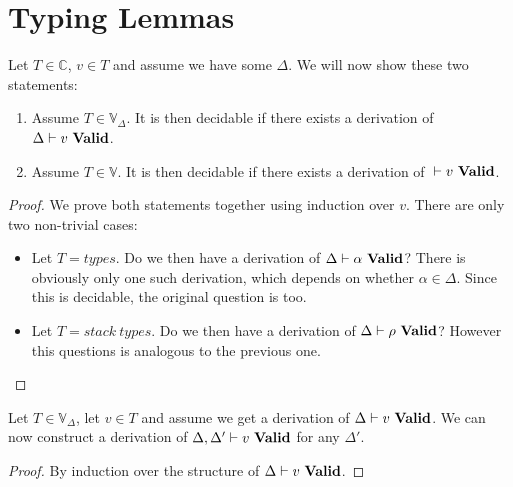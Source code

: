 \section{Typing Lemmas}

\begin{lemma}
  Let $T \in \mathbb{C}$, $v \in T$ and assume we have some $\Delta$. We will
  now show these two statements:
  \begin{enumerate}
  \item Assume $T \in \mathbb{V}_\Delta$. It is then decidable if there exists a
    derivation of ${\Delta} |- {v}\ \mathbf{Valid}$.
  \item Assume $T \in \mathbb{V}$. It is then decidable if there exists a
    derivation of ${} |- {v}\ \mathbf{Valid}$.
  \end{enumerate}
\end{lemma}
\label{dec:type}
\begin{proof}
  We prove both statements together using induction over $v$. There are only two
  non-trivial cases:

  \begin{itemize}
  \item Let $T = types$. Do we then have a derivation of
    ${\Delta} |- {\alpha}\ \mathbf{Valid}$?  There is obviously only one such derivation,
    which depends on whether $\alpha \in \Delta$. Since this is decidable, the
    original question is too.
  \item Let $T = stack\ types$. Do we then have a derivation of
    ${\Delta} |- {\rho}\ \mathbf{Valid}$? However this questions is analogous to the previous
    one.
  \end{itemize}
\end{proof}

\begin{lemma}
  Let $T \in \mathbb{V}_\Delta$, let $v \in T$ and assume we get a derivation of
  ${\Delta} |- {v}\ \mathbf{Valid}$. We can now construct a derivation of
  ${\Delta,\Delta'} |- {v}\ \mathbf{Valid}$ for any $\Delta'$.
\end{lemma}
\begin{proof}
  By induction over the structure of ${\Delta} |- {v}\ \mathbf{Valid}$.
\end{proof}
